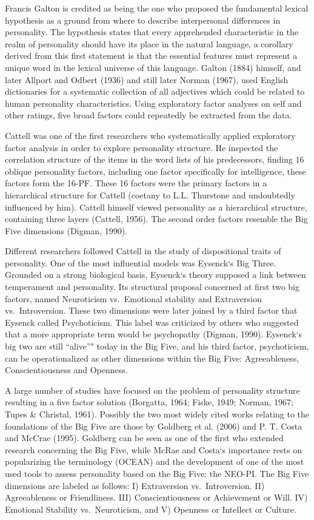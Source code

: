 \documentclass[,man,floatsintext]{apa6}
\begin{document}
Francis Galton is credited as being the one who proposed the fundamental
lexical hypothesis as a ground from where to describe interpersonal
differences in personality. The hypothesis states that every apprehended
characteristic in the realm of personality should have its place in the
natural language, a corollary derived from this first statement is that
the essential features must represent a unique word in the lexical
universe of this language. Galton (1884) himself, and later Allport and
Odbert (1936) and still later Norman (1967), used English dictionaries
for a systematic collection of all adjectives which could be related to
human personality characteristics. Using exploratory factor analyses on
self and other ratings, five broad factors could repeatedly be extracted
from the data.

Cattell was one of the first researchers who systematically applied
exploratory factor analysis in order to explore personality structure.
He inspected the correlation structure of the items in the word lists of
his predecessors, finding 16 oblique personality factors, including one
factor specifically for intelligence, these factors form the 16-PF.
These 16 factors were the primary factors in a hierarchical structure
for Cattell (coetany to L.L. Thurstone and undoubtedly influenced by
him). Cattell himself viewed personality as a hierarchical structure,
containing three layers (Cattell, 1956). The second order factors
resemble the Big Five dimensions (Digman, 1990).

Different researchers followed Cattell in the study of dispositional
traits of personality. One of the most influential models was Eysenck`s
Big Three. Grounded on a strong biological basis, Eysenck`s theory
supposed a link between temperament and personality. Its structural
proposal concerned at first two big factors, named Neuroticism
vs.~Emotional stability and Extraversion vs.~Introversion. These two
dimensions were later joined by a third factor that Eysenck called
Psychoticism. This label was criticized by others who suggested that a
more appropriate term would be psychopathy (Digman, 1990). Eysenck`s big
two are still \enquote{alive}" today in the Big Five, and his third
factor, psychoticism, can be operationalized as other dimensions within
the Big Five: Agreeableness, Conscientiousness and Openness.

A large number of studies have focused on the problem of personality
structure resulting in a five factor solution (Borgatta, 1964; Fiske,
1949; Norman, 1967; Tupes \& Christal, 1961). Possibly the two most
widely cited works relating to the foundations of the Big Five are those
by Goldberg et al. (2006) and P. T. Costa and McCrae (1995). Goldberg
can be seen as one of the first who extended research concerning the Big
Five, while McRae and Costa`s importance rests on popularizing the
terminology (OCEAN) and the development of one of the most used tools to
assess personality based on the Big Five: the NEO-PI. The Big Five
dimensions are labeled as follows: I) Extraversion vs.~Introversion. II)
Agreeableness or Friendliness. III) Conscientiousness or Achievement or
Will. IV) Emotional Stability vs.~Neuroticism, and V) Openness or
Intellect or Culture.
\end{document}
